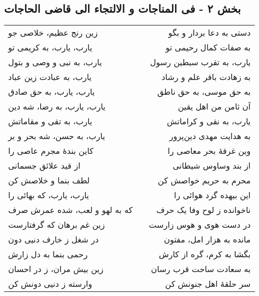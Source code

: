 \begin{center}
\section*{بخش ۲ - فی المناجات و الالتجاء الی قاضی الحاجات}
\label{sec:002}
\begin{longtable}{l p{0.5cm} r}
زین رنج عظیم، خلاصی جو
&&
دستی به دعا بردار و بگو
\\
یارب، یارب، به کریمی تو
&&
به صفات کمال رحیمی تو
\\
یارب، به نبی و وصی و بتول
&&
یارب، به تقرب سبطین رسول
\\
یارب، به عبادت زین عباد
&&
به زهادت باقر علم و رشاد
\\
یارب، یارب، به حق صادق
&&
به حق موسی، به حق ناطق
\\
یارب، یارب، به رضا، شه دین
&&
آن ثامن من اهل یقین
\\
یارب، به تقی و مقاماتش
&&
یارب، به نقی و کراماتش
\\
یارب، به حسن، شه بحر و بر
&&
به هدایت مهدی دین‌پرور
\\
کاین بندهٔ مجرم عاصی را
&&
وین غرقهٔ بحر معاصی را
\\
از قید علائق جسمانی
&&
از بند وساوس شیطانی
\\
لطف بنما و خلاصش کن
&&
محرم به حریم خواصش کن
\\
یارب، یارب، که بهائی را
&&
این بیهده گرد هوائی را
\\
که به لهو و لعب، شده عمرش صرف
&&
ناخوانده ز لوح وفا یک حرف
\\
زین غم برهان که گرفتارست
&&
در دست هوی و هوس زارست
\\
در شغل ز خارف دنیی دون
&&
مانده به هزار امل، مفتون
\\
رحمی بنما به دل زارش
&&
بگشا به کرم، گره از کارش
\\
زین بیش مران، ز در احسان
&&
به سعادت ساحت قرب رسان
\\
وارسته ز دنیی دونش کن
&&
سر حلقهٔ اهل جنونش کن
\\
\end{longtable}
\end{center}
